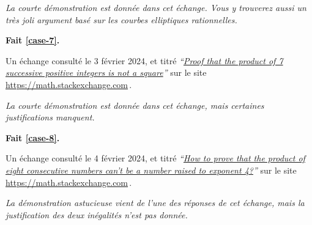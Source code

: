 \smallskip
\noindent
\emph{La courte démonstration est donnée dans cet échange. Vous y trouverez aussi un très joli argument basé sur les courbes elliptiques rationnelles.}




\bigskip
\textbf{Fait \ref{case-7}.}
	
\smallskip
\noindent
Un échange consulté le 3 février 2024, et titré
\emph{\enquote{\href{https://math.stackexchange.com/q/2334887/52365}{Proof that the product of 7 successive positive integers is not a square}}} 
sur le site \url{https://math.stackexchange.com}\,.
	
\smallskip
\noindent
\emph{La courte démonstration est donnée dans cet échange, mais certaines justifications manquent.}




\bigskip
\textbf{Fait \ref{case-8}.}
	
\smallskip
\noindent
Un échange consulté le 4 février 2024, et titré
\emph{\enquote{\href{https://math.stackexchange.com/a/2271715/52365}{How to prove that the product of eight consecutive numbers can't be a number raised to exponent 4?}}} 
sur le site \url{https://math.stackexchange.com}\,.

\smallskip
\noindent
\emph{La démonstration astucieuse vient de l'une des réponses de cet échange, mais la justification des deux inégalités n'est pas donnée.}

